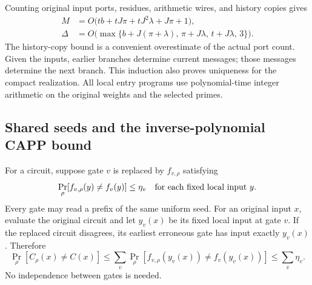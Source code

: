 Counting original input ports, residues, arithmetic wires, and history
copies gives
\begin{align}
 M&=O\bigl(tb+tJ\pi+tJ^2\lambda+J\pi+1\bigr),
       \label{eq:compact-edges}\\
 \Delta&=O\bigl(\max\{b+J(\pi+\lambda),\,
 \pi+J\lambda,\,t+J\lambda,\,3\}\bigr).
       \label{eq:compact-degree}
\end{align}
The history-copy bound is a convenient overestimate of the actual
port count. Given the inputs, earlier branches determine current
messages; those messages determine the next branch. This induction
also proves uniqueness for the compact realization. All local entry
programs use polynomial-time integer arithmetic on the original
weights and the selected primes.

\subsection{Shared seeds and the inverse-polynomial CAPP bound}

For a circuit, suppose gate $v$ is replaced by $f_{v,\rho}$ satisfying
\[
 \Pr_\rho[f_{v,\rho}(y)\ne f_v(y)]\le\eta_v
 \quad\hbox{for each fixed local input }y.
\]
Every gate may read a prefix of the same uniform seed. For an original
input $x$, evaluate the original circuit and let $y_v(x)$ be its fixed
local input at gate $v$. If the replaced circuit disagrees, its earliest
erroneous gate has input exactly $y_v(x)$. Therefore
\begin{equation}\label{eq:gate-error}
 \Pr_\rho[C_\rho(x)\ne C(x)]
 \le\sum_v\Pr_\rho[f_{v,\rho}(y_v(x))\ne f_v(y_v(x))]
 \le\sum_v\eta_v.
\end{equation}
No independence between gates is needed.

